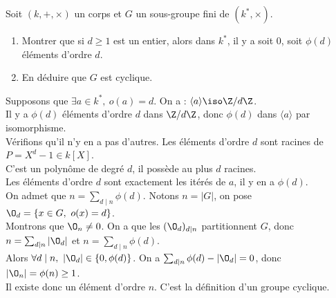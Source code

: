 \documentclass[11pt]{article}
\begin{document}
\begin{exercice}{}{}
    Soit $(k,+,\times)$ un corps et $G$ un sous-groupe fini de $(k^*,\times)$.
    \begin{enumerate}
        \item Montrer que si $d\geq1$ est un entier, alors dans $k^*$, il y a soit $0$, soit $\phi(d)$ éléments d'ordre $d$.
        \item En déduire que $G$ est cyclique.
    \end{enumerate}
    \tcblower
     Supposons que $\exists a \in k^*, ~ o(a)=d$. On a : $\langle a \rangle \iso \Z/d\Z$.\\
    Il y a $\phi(d)$ éléments d'ordre $d$ dans $\Z/d\Z$, donc $\phi(d)$ dans $\langle a \rangle$ par isomorphisme.\\
    Vérifions qu'il n'y en a pas d'autres. Les éléments d'ordre $d$ sont racines de $P=X^d-1\in k[X]$.\\
    C'est un polynôme de degré $d$, il possède au plus $d$ racines.\\
    Les éléments d'ordre $d$ sont exactement les itérés de $a$, il y en a $\phi(d)$.\\
     On admet que $n=\sum_{d\mid n}\phi(d)$. Notons $n=|G|$, on pose $\O_d=\{x\in G, ~ o(x)=d\}$.\\
    Montrons que $\O_n\neq0$. On a que les $(\O_d)_{d\mid n}$ partitionnent $G$, donc $n=\sum_{d\mid n}|\O_d|$ et $n=\sum_{d\mid n}\phi(d)$.\\
    Alors $\forall d \mid n, ~ |\O_d|\in\{0,\phi(d)\}$. On a $\sum_{d\mid n}\phi(d)-|\O_d|=0$, donc $|\O_n|=\phi(n)\geq1$.\\
    Il existe donc un élément d'ordre $n$. C'est la définition d'un groupe cyclique.
\end{exercice}
\end{document}

